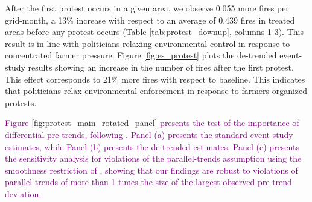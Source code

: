 \documentclass[12pt]{article}
\begin{document}

After the first protest occurs in a given area, we observe 0.055 more fires per grid-month, a 13\% increase with respect to an average of 0.439 fires in treated areas before any protest occurs (Table \ref{tab:protest_downup}, columns 1-3). This result is in line with politicians relaxing environmental control in response to concentrated farmer pressure.
Figure \ref{fig:es_protest} plots the de-trended event-study results showing an increase in the number of fires after the first protest. This effect corresponds to 21\% more fires with respect to baseline. This indicates that politicians relax environmental enforcement in response to farmers organized protests. %


\textcolor{purple}{Figure \ref{fig:protest_main_rotated_panel} presents the test of the importance of differential pre-trends, following \citet{dustmann2022reallocation}. Panel (a) presents the standard event-study estimates, while Panel (b) presents the de-trended estimates. Panel (c) presents the sensitivity analysis for violations of the parallel-trends assumption using the smoothness restriction of \citet{rambachan2023more}, showing that our findings are robust to violations of parallel trends of more than 1 times the size of the largest observed pre-trend deviation.}
\end{document}
